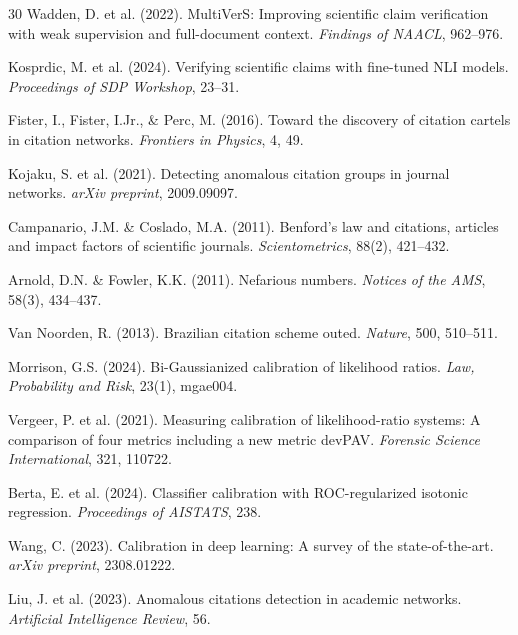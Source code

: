 \documentclass[sigconf,nonacm]{acmart}
\begin{document}
\begin{thebibliography}{30}
Wadden, D. et al. (2022).
\newblock MultiVerS: Improving scientific claim verification with weak supervision and full-document context.
\newblock \emph{Findings of NAACL}, 962--976.

Kosprdic, M. et al. (2024).
\newblock Verifying scientific claims with fine-tuned NLI models.
\newblock \emph{Proceedings of SDP Workshop}, 23--31.

Fister, I., Fister, I.Jr., \& Perc, M. (2016).
\newblock Toward the discovery of citation cartels in citation networks.
\newblock \emph{Frontiers in Physics}, 4, 49.

Kojaku, S. et al. (2021).
\newblock Detecting anomalous citation groups in journal networks.
\newblock \emph{arXiv preprint}, 2009.09097.

Campanario, J.M. \& Coslado, M.A. (2011).
\newblock Benford's law and citations, articles and impact factors of scientific journals.
\newblock \emph{Scientometrics}, 88(2), 421--432.

Arnold, D.N. \& Fowler, K.K. (2011).
\newblock Nefarious numbers.
\newblock \emph{Notices of the AMS}, 58(3), 434--437.

Van Noorden, R. (2013).
\newblock Brazilian citation scheme outed.
\newblock \emph{Nature}, 500, 510--511.


Morrison, G.S. (2024).
\newblock Bi-Gaussianized calibration of likelihood ratios.
\newblock \emph{Law, Probability and Risk}, 23(1), mgae004.

Vergeer, P. et al. (2021).
\newblock Measuring calibration of likelihood-ratio systems: A comparison of four metrics including a new metric devPAV.
\newblock \emph{Forensic Science International}, 321, 110722.

Berta, E. et al. (2024).
\newblock Classifier calibration with ROC-regularized isotonic regression.
\newblock \emph{Proceedings of AISTATS}, 238.

Wang, C. (2023).
\newblock Calibration in deep learning: A survey of the state-of-the-art.
\newblock \emph{arXiv preprint}, 2308.01222.

Liu, J. et al. (2023).
\newblock Anomalous citations detection in academic networks.
\newblock \emph{Artificial Intelligence Review}, 56.


\end{thebibliography}
\end{document}
